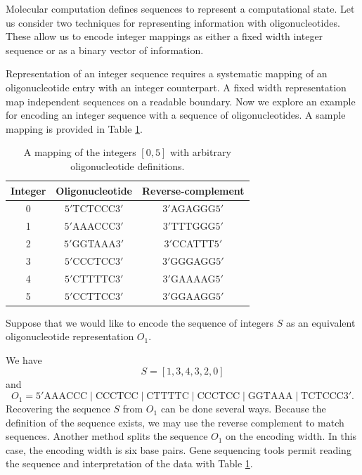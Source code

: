 Molecular computation defines sequences to represent a computational state.  Let us consider two techniques for representing information with oligonucleotides.  These allow us to encode integer mappings as either a fixed width integer sequence or as a binary vector of information.

Representation of an integer sequence requires a systematic mapping of an oligonucleotide entry with an integer counterpart.  A fixed width representation map independent sequences on a readable boundary.  Now we explore an example for encoding an integer sequence with a sequence of oligonucleotides.  A sample mapping is provided in Table \ref{integer2OligoTable}.

\begin{table}[htdp]
\caption{A mapping of the integers $[0,5]$ with arbitrary oligonucleotide definitions.}
\begin{center}
\begin{tabular}{|c|c|c|}
\hline
 \textbf{Integer} & \textbf{Oligonucleotide} & \textbf{Reverse-complement}\\ \hline
0 & $5'$TCTCCC$3'$ & $3'$AGAGGG$5'$ \\
1 & $5'$AAACCC$3'$ & $3'$TTTGGG$5'$ \\
2 & $5'$GGTAAA$3'$ & $3'$CCATTT$5'$ \\
3 & $5'$CCCTCC$3'$ & $3'$GGGAGG$5'$ \\
4 & $5'$CTTTTC$3'$ & $3'$GAAAAG$5'$ \\
5 & $5'$CCTTCC$3'$ & $3'$GGAAGG$5'$ \\ \hline
\end{tabular}
\end{center}
\label{integer2OligoTable}
\end{table}%

Suppose that we would like to encode the sequence of integers $S$ as an equivalent oligonucleotide representation $O_1$.

We have 
\[
S = [1, 3, 4, 3, 2, 0]
\]
and 
\[
O_1 = 5'\text{AAACCC}\mid \text{CCCTCC}\mid \text{CTTTTC}\mid \text{CCCTCC}\mid \text{GGTAAA}\mid \text{TCTCCC}3'.
\]
Recovering the sequence $S$ from $O_1$ can be done several ways.  Because the definition of the sequence exists, we may use the reverse complement to match sequences.  Another method splits the sequence $O_1$ on the encoding width.  In this case, the encoding width is six base pairs.  Gene sequencing tools permit reading the sequence and interpretation of the data with Table \ref{integer2OligoTable}.

